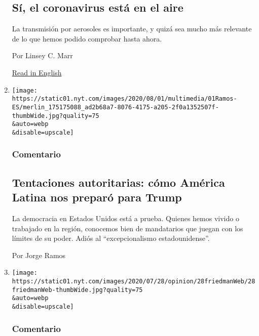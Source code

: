 \begin{enumerate}
  \hypertarget{suxed-el-coronavirus-estuxe1-en-el-aire}{%
  \subsection{Sí, el coronavirus está en el
  aire}\label{suxed-el-coronavirus-estuxe1-en-el-aire}}

  La transmisión por aerosoles es importante, y quizá sea mucho más
  relevante de lo que hemos podido comprobar hasta ahora.

  Por Linsey C. Marr

  \href{https://www.nytimes.com/2020/07/30/opinion/coronavirus-aerosols.html}{Read
  in English}
\item
  \href{/es/2020/08/01/espanol/opinion/trump-autoritarismo.html}{}

  \texttt{[image: https://static01.nyt.com/images/2020/08/01/multimedia/01Ramos-ES/merlin\_175175088\_ad2b68a7-8076-4175-a205-2f0a1352507f-thumbWide.jpg?quality=75\\\&auto=webp\\\&disable=upscale]}

  \hypertarget{comentario-6}{%
  \subsubsection{Comentario}\label{comentario-6}}

  \hypertarget{tentaciones-autoritarias-cuxf3mo-amuxe9rica-latina-nos-preparuxf3-para-trump}{%
  \subsection{Tentaciones autoritarias: cómo América Latina nos preparó
  para
  Trump}\label{tentaciones-autoritarias-cuxf3mo-amuxe9rica-latina-nos-preparuxf3-para-trump}}

  La democracia en Estados Unidos está a prueba. Quienes hemos vivido o
  trabajado en la región, conocemos bien de mandatarios que juegan con
  los límites de su poder. Adiós al ``excepcionalismo estadounidense''.

  Por Jorge Ramos
\item
  \href{/es/2020/07/30/espanol/opinion/usar-cubrebocas-politica.html}{}

  \texttt{[image: https://static01.nyt.com/images/2020/07/28/opinion/28friedmanWeb/28friedmanWeb-thumbWide.jpg?quality=75\\\&auto=webp\\\&disable=upscale]}

  \hypertarget{comentario-7}{%
  \subsubsection{Comentario}\label{comentario-7}}


\end{enumerate}
